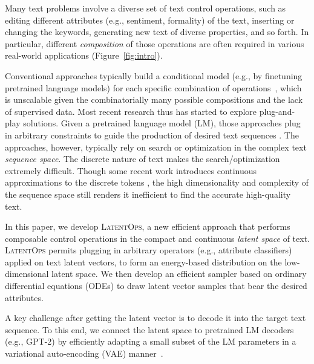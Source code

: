 \documentclass[11pt]{article}
\begin{document}
Many text problems involve a diverse set of text control operations, such as editing different attributes (e.g., sentiment, formality) of the text, inserting or changing the keywords, generating new text of diverse properties, and so forth. In particular, different \emph{composition} of those operations are often required in various real-world applications (Figure~\ref{fig:intro}).  

Conventional approaches typically build a conditional model (e.g., by finetuning pretrained language models) for each specific combination of operations~\cite{hu2017toward,keskarCTRL2019,DBLP:journals/corr/abs-1909-08593}, which is unscalable given the combinatorially many possible compositions and the lack of supervised data. Most recent research thus has started to explore plug-and-play solutions. Given a pretrained language model (LM), those approaches plug in arbitrary constraints to guide the production of desired text sequences \cite{Dathathri2020Plug,DBLP:journals/corr/abs-2104-05218, DBLP:conf/nips/KumarMST21, DBLP:conf/emnlp/KrauseGMKJSR21,DBLP:journals/corr/abs-2203-13299,QinCOLD}. 
The approaches, however, typically rely on search or optimization in the complex text \emph{sequence space}. The discrete nature of text makes the search/optimization extremely difficult. Though some recent work introduces continuous approximations to the discrete tokens \citep{qin2020back,QinCOLD,DBLP:conf/nips/KumarMST21}, the high dimensionality and complexity of the sequence space still renders it inefficient to find the accurate high-quality text.


In this paper, we develop \textsc{LatentOps}, a new efficient approach that performs composable control operations in the compact and continuous \emph{latent space} of text. \textsc{LatentOps} permits plugging in arbitrary operators (e.g., attribute classifiers) applied on text latent vectors, to form an energy-based distribution on the low-dimensional latent space. We then develop  
an efficient sampler based on ordinary differential equations (ODEs) \cite{DBLP:conf/iclr/0011SKKEP21,nie2021controllable,Vahdat_LSGM} to draw latent vector samples that bear the desired attributes. 


A key challenge after getting the latent vector is to decode it into the target text sequence. To this end, we connect the latent space to pretrained LM decoders (e.g., GPT-2) by efficiently adapting a small subset of the LM parameters in a variational auto-encoding (VAE) manner~\cite{DBLP:journals/corr/KingmaW13,DBLP:conf/conll/BowmanVVDJB16}. 
\end{document}
